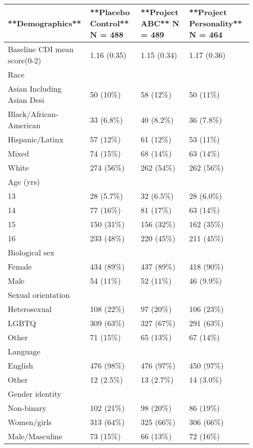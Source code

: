 \begin{table}[ht]
\centering
\begin{tabular}{llll}
  \hline
**Demographics** & **Placebo Control**  
N = 488 & **Project ABC**  
N = 489 & **Project Personality**  
N = 464 \\ 
  \hline
Baseline CDI mean score(0-2) & 1.16 (0.35) & 1.15 (0.34) & 1.17 (0.36) \\ 
  Race &  &  &  \\ 
  Asian Including Asian Desi & 50 (10\%) & 58 (12\%) & 50 (11\%) \\ 
  Black/African-American & 33 (6.8\%) & 40 (8.2\%) & 36 (7.8\%) \\ 
  Hispanic/Latinx & 57 (12\%) & 61 (12\%) & 53 (11\%) \\ 
  Mixed & 74 (15\%) & 68 (14\%) & 63 (14\%) \\ 
  White & 274 (56\%) & 262 (54\%) & 262 (56\%) \\ 
  Age (yrs) &  &  &  \\ 
  13 & 28 (5.7\%) & 32 (6.5\%) & 28 (6.0\%) \\ 
  14 & 77 (16\%) & 81 (17\%) & 63 (14\%) \\ 
  15 & 150 (31\%) & 156 (32\%) & 162 (35\%) \\ 
  16 & 233 (48\%) & 220 (45\%) & 211 (45\%) \\ 
  Biological sex &  &  &  \\ 
  Female & 434 (89\%) & 437 (89\%) & 418 (90\%) \\ 
  Male & 54 (11\%) & 52 (11\%) & 46 (9.9\%) \\ 
  Sexual orientation &  &  &  \\ 
  Heterosexual & 108 (22\%) & 97 (20\%) & 106 (23\%) \\ 
  LGBTQ & 309 (63\%) & 327 (67\%) & 291 (63\%) \\ 
  Other & 71 (15\%) & 65 (13\%) & 67 (14\%) \\ 
  Language &  &  &  \\ 
  English & 476 (98\%) & 476 (97\%) & 450 (97\%) \\ 
  Other & 12 (2.5\%) & 13 (2.7\%) & 14 (3.0\%) \\ 
  Gender identity &  &  &  \\ 
  Non-binary & 102 (21\%) & 98 (20\%) & 86 (19\%) \\ 
  Women/girls & 313 (64\%) & 325 (66\%) & 306 (66\%) \\ 
  Male/Masculine & 73 (15\%) & 66 (13\%) & 72 (16\%) \\ 

\end{tabular}
\end{table}
